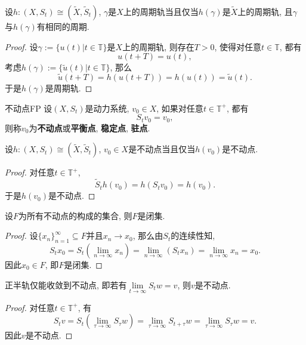 \begin{exercise}
	设$h:(X,S_{t})\cong(\tilde{X},\tilde{S}_{t})$, $\gamma$是$X$上的周期轨当且仅当$h(\gamma)$是$\tilde{X}$上的周期轨, 且$\gamma$与$h(\gamma)$有相同的周期. 
\end{exercise}

\begin{proof}
	设$\gamma:=\{u(t)|t\in\mathbb{T}\}$是$X$上的周期轨, 则存在$T>0$, 使得对任意$t\in\mathbb{T}$, 都有$$u(t+T)=u(t),$$考虑$h(\gamma):=\{\tilde{u}(t)|t\in\mathbb{T}\}$, 那么$$\tilde{u}(t+T)=h(u(t+T))=h(u(t))=\tilde{u}(t).$$于是$h(\gamma)$是周期轨. 
\end{proof}

\begin{definition}{不动点}{FP}
	设$(X,S_{t})$是动力系统, $v_{0}\in X$, 如果对任意$t\in\mathbb{T}^{+}$, 都有$$S_{t}v_{0}=v_{0},$$则称$v_{0}$为\textbf{不动点}或\textbf{平衡点}, \textbf{稳定点}, \textbf{驻点}.
\end{definition}

\begin{exercise}
	设$h:(X,S_{t})\cong(\tilde{X},\tilde{S}_{t})$, $v_{0}\in X$是不动点当且仅当$h(v_{0})$是不动点.
\end{exercise}

\begin{proof}
	对任意$t\in\mathbb{T}^{+}$, $$\tilde{S}_{t}h(v_{0})=h(S_{t}v_{0})=h(v_{0}).$$于是$h(v_{0})$是不动点.
\end{proof}

\begin{exercise}
	设$F$为所有不动点的构成的集合, 则$F$是闭集. 
\end{exercise}

\begin{proof}
	设$\{x_{n}\}_{n=1}^{\infty}\subseteq F$并且$x_{n}\to x_{0}$, 那么由$S_{t}$的连续性知, $$
	S_{t}x_{0}=S_{t}(\lim_{n\to\infty}x_{n})=\lim_{n\to\infty}(S_{t}x_{n})=\lim_{n\to\infty}x_{n}=x_{0}.$$因此$x_{0}\in F$, 即$F$是闭集.
\end{proof}

\begin{exercise}
	正半轨仅能收敛到不动点, 即若有$\lim\limits_{t\to\infty}S_{t}w=v$, 则$v$是不动点.
\end{exercise}

\begin{proof}
	对任意$t\in\mathbb{T}^{+}$, 有$$S_{t}v=S_{t}\left(\lim_{\tau\to\infty}S_{\tau}w\right)=\lim_{\tau\to\infty}S_{t+\tau}w=\lim_{\tau\to\infty}S_{\tau}w=v.$$因此$v$是不动点.
\end{proof}

